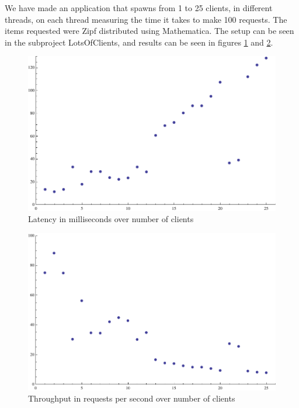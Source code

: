 \documentclass[11pt,a4paper]{article}
\begin{document}
We have made an application that spawns from 1 to 25 clients, in different
threads, on each thread measuring the time it takes to make 100 requests.
The items requested were Zipf distributed using Mathematica.
The setup can be seen in the subproject LotsOfClients, and results can be
 seen in figures \ref{fig:latency} and \ref{fig:throughput}.

\begin{figure}[h!]
    \includegraphics[width=\textwidth]{latencygraph.pdf}
    \caption{Latency in milliseconds over number of clients}
    \label{fig:latency}
\end{figure}
\begin{figure}[h!]
    \includegraphics[width=\textwidth]{throughputgraph.pdf}
    \caption{Throughput in requests per second over number of clients}
    \label{fig:throughput}
\end{figure}

\end{document}
